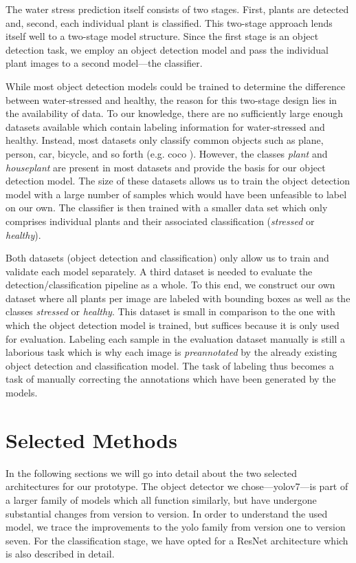 \documentclass[draft,final]{vutinfth} %
\begin{document}
The water stress prediction itself consists of two stages. First,
plants are detected and, second, each individual plant is
classified. This two-stage approach lends itself well to a two-stage
model structure. Since the first stage is an object detection task, we
employ an object detection model and pass the individual plant images
to a second model---the classifier.

While most object detection models could be trained to determine the
difference between water-stressed and healthy, the reason for this
two-stage design lies in the availability of data. To our knowledge,
there are no sufficiently large enough datasets available which
contain labeling information for water-stressed and healthy. Instead,
most datasets only classify common objects such as plane, person,
car, bicycle, and so forth (e.g. \gls{coco} \cite{lin2015}). However,
the classes \emph{plant} and \emph{houseplant} are present in most
datasets and provide the basis for our object detection model. The
size of these datasets allows us to train the object detection model
with a large number of samples which would have been unfeasible to
label on our own. The classifier is then trained with a smaller data
set which only comprises individual plants and their associated
classification (\emph{stressed} or \emph{healthy}).

Both datasets (object detection and classification) only allow us to
train and validate each model separately. A third dataset is needed
to evaluate the detection/classification pipeline as a whole. To this
end, we construct our own dataset where all plants per image are
labeled with bounding boxes as well as the classes \emph{stressed} or
\emph{healthy}. This dataset is small in comparison to the one with
which the object detection model is trained, but suffices because it
is only used for evaluation. Labeling each sample in the evaluation
dataset manually is still a laborious task which is why each image is
\emph{preannotated} by the already existing object detection and
classification model. The task of labeling thus becomes a task of
manually correcting the annotations which have been generated by the
models.

\section{Selected Methods}
\label{sec:selected-methods}

In the following sections we will go into detail about the two
selected architectures for our prototype. The object detector we
chose---\gls{yolo}v7---is part of a larger family of models which all
function similarly, but have undergone substantial changes from
version to version. In order to understand the used model, we trace
the improvements to the \gls{yolo} family from version one to version
seven. For the classification stage, we have opted for a ResNet
architecture which is also described in detail.
\end{document}
